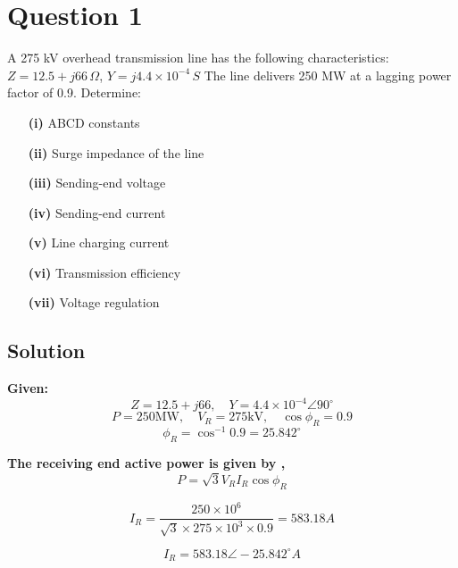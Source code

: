 \documentclass[12pt]{article}
\begin{document}
	
	
	\newpage 
	
	
	\section*{Question 1}
	
	
	
	A 275 kV overhead transmission line has the following characteristics:  
	\( Z = 12.5 + j66 \, \Omega \), \( Y = j4.4 \times 10^{-4} \, S \) 
	The line delivers 250 MW at a lagging power factor of 0.9. Determine:
	
	\begin{enumerate}
		\item[\textbf{(i)}] ABCD constants
		\item[\textbf{(ii)}] Surge impedance of the line
		\item[\textbf{(iii)}] Sending-end voltage
		\item[\textbf{(iv)}] Sending-end current
		\item[\textbf{(v)}] Line charging current
		\item[\textbf{(vi)}] Transmission efficiency
		\item[\textbf{(vii)}] Voltage regulation
	\end{enumerate}
	
	
	\subsection*{Solution} 
	
	\textbf{Given:}  
	\[
	Z = 12.5 + j66, \quad Y = 4.4 \times 10^{-4} \angle 90^\circ
	\]
	\[
	P = 250 \text{MW}, \quad V_R = 275 \text{kV}, \quad \cos\phi_R = 0.9
	\]
	\[
	\phi_R = \cos^{-1} 0.9 = 25.842^\circ
	\]
	
	
     \textbf{The receiving end active power is given by ,}
	\begin{equation}
		P = \sqrt{3} V_R I_R \cos\phi_R
	\end{equation}
	
	\begin{equation}
		I_R = \frac{250 \times 10^6}{\sqrt{3} \times 275 \times 10^3 \times 0.9} = 583.18 A
	\end{equation}
	
	\[
	I_R = 583.18 \angle -25.842^\circ A
	\]
	
\end{document}
